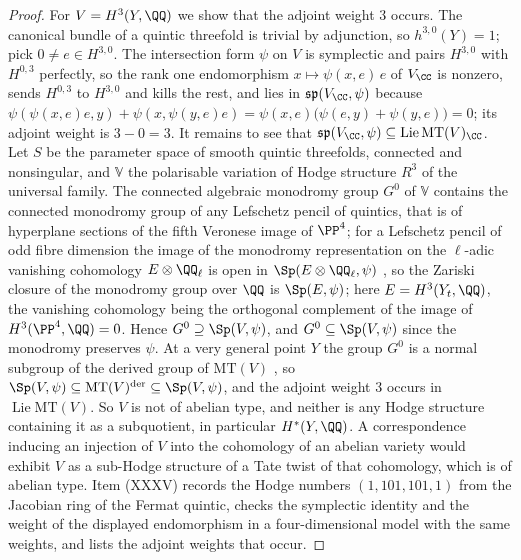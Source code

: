 \begin{proof}
For $V=H^{3}(Y,\QQ)$ we show that the adjoint weight $3$ occurs. The
canonical bundle of a quintic threefold is trivial by adjunction, so
$h^{3,0}(Y)=1$; pick $0\ne e\in H^{3,0}$. The intersection form $\psi$ on $V$
is symplectic and pairs $H^{3,0}$ with $H^{0,3}$ perfectly, so the rank one
endomorphism $x\mapsto\psi(x,e)\,e$ of $V_{\CC}$ is nonzero, sends $H^{0,3}$
to $H^{3,0}$ and kills the rest, and lies in $\mathfrak{sp}(V_{\CC},\psi)$
because $\psi(\psi(x,e)e,y)+\psi(x,\psi(y,e)e)
=\psi(x,e)\bigl(\psi(e,y)+\psi(y,e)\bigr)=0$; its adjoint weight is
$3-0=3$. It remains to see that $\mathfrak{sp}(V_{\CC},\psi)\subseteq
\operatorname{Lie}\mathrm{MT}(V)_{\CC}$. Let $S$ be the parameter space of smooth quintic
threefolds, connected and nonsingular, and $\mathbb{V}$ the polarisable
variation of Hodge structure $R^{3}$ of the universal family. The connected
algebraic monodromy group $G^{0}$ of $\mathbb{V}$ contains the connected
monodromy group of any Lefschetz pencil of quintics, that is of hyperplane
sections of the fifth Veronese image of $\PP^{4}$; for a Lefschetz pencil of
odd fibre dimension the image of the monodromy representation on the
$\ell$-adic vanishing cohomology $E\otimes\QQ_{\ell}$ is open in
$\Sp(E\otimes\QQ_{\ell},\psi)$ \cite[Theorem 5.10]{Del74}, so the Zariski
closure of the monodromy group over $\QQ$ is $\Sp(E,\psi)$; here
$E=H^{3}(Y_{t},\QQ)$, the vanishing cohomology being the orthogonal
complement of the image of $H^{3}(\PP^{4},\QQ)=0$. Hence $G^{0}\supseteq
\Sp(V,\psi)$, and $G^{0}\subseteq\Sp(V,\psi)$ since the monodromy preserves
$\psi$. At a very general
point $Y$ the group $G^{0}$ is a normal subgroup of the derived group of
$\mathrm{MT}(V)$ \cite[Theorem 1]{And92}, so $\Sp(V,\psi)\subseteq
\mathrm{MT}(V)^{\mathrm{der}}\subseteq\Sp(V,\psi)$, and the adjoint weight
$3$ occurs in $\operatorname{Lie}\mathrm{MT}(V)$. So $V$ is not of abelian type, and
neither is any Hodge structure containing it as a subquotient, in particular
$H^{*}(Y,\QQ)$. A correspondence inducing an injection of $V$ into the
cohomology of an abelian variety would exhibit $V$ as a sub-Hodge structure
of a Tate twist of that cohomology, which is of abelian type. Item (XXXV)
records the Hodge numbers $(1,101,101,1)$ from the Jacobian ring of the
Fermat quintic, checks the symplectic identity and the weight of the
displayed endomorphism in a four-dimensional model with the same weights, and
lists the adjoint weights that occur.
\end{proof}


